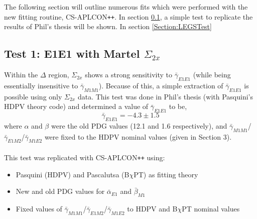 \documentclass[]{article}
\begin{document}
The following section will outline numerous fits which were performed with the new fitting routine, CS-APLCON\texttt{++}. In section \ref{Section:PhilTest}, a simple test to replicate the results of Phil's thesis will be shown. In section \ref{Section:LEGSTest}

\subsection{Test 1: E1E1 with Martel $\Sigma_{2x}$}\label{Section:PhilTest}

Within the $\Delta$ region, $\Sigma_{2x}$ shows a strong sensitivity to $\bar{\gamma}_{E1E1}$ (while being essentially insensitive to $\bar{\gamma}_{M1M1}$). Because of this, a simple extraction of $\bar{\gamma}_{E1E1}$ is possible using only $\Sigma_{2x}$ data. This test was done in Phil's thesis (with Pasquini's HDPV theory code) and determined a value of $\bar{\gamma}_{E1E1}$ to be,
%
\begin{equation}
\bar{\gamma}_{E1E1} = -4.3 \pm 1.5 
\end{equation}
%
where $\alpha$ and $\beta$ were the old PDG values (12.1 and 1.6 respectively), and $\bar{\gamma}_{M1M1}$/$\bar{\gamma}_{E1M2}$/$\bar{\gamma}_{M1E2}$ were fixed to the HDPV nominal values (given in Section 3). \\

\noindent \\This test was replicated with CS-APLCON\texttt{++} using:
\begin{itemize}
	\item Pasquini (HDPV) and Pascalutsa (B$\chi$PT) as fitting theory
	\item New and old PDG values for $\bar{\alpha}_{E1}$ and $\bar{\beta}_{M1}$
	\item Fixed values of $\bar{\gamma}_{M1M1}$/$\bar{\gamma}_{E1M2}$/$\bar{\gamma}_{M1E2}$ to HDPV and B$\chi$PT nominal values
\end{itemize}
\end{document}
